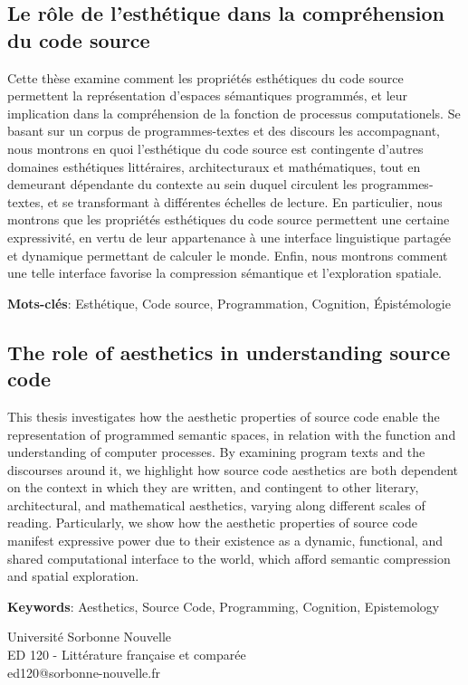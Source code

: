 \small
\subsection*{Le rôle de l'esthétique dans la compréhension du code source}


Cette thèse examine comment les propriétés esthétiques du code source permettent la représentation d'espaces sémantiques programmés, et leur implication dans la compréhension de la fonction de processus computationels. Se basant sur un corpus de programmes-textes et des discours les accompagnant, nous montrons en quoi l'esthétique du code source est contingente d'autres domaines esthétiques littéraires, architecturaux et mathématiques, tout en demeurant dépendante du contexte au sein duquel circulent les programmes-textes, et se transformant à différentes échelles de lecture. En particulier, nous montrons que les propriétés esthétiques du code source permettent une certaine expressivité, en vertu de leur appartenance à une interface linguistique partagée et dynamique permettant de calculer le monde. Enfin, nous montrons comment une telle interface favorise la compression sémantique et l'exploration spatiale.

\textbf{Mots-clés}: Esthétique, Code source, Programmation, Cognition, Épistémologie
\linebreak
\linebreak
\subsection*{The role of aesthetics in understanding source code}

This thesis investigates how the aesthetic properties of source code enable the representation of programmed semantic spaces, in relation with the function and understanding of computer processes. By examining program texts and the discourses around it, we highlight how source code aesthetics are both dependent on the context in which they are written, and contingent to other literary, architectural, and mathematical aesthetics, varying along different scales of reading. Particularly, we show how the aesthetic properties of source code manifest expressive power due to their existence as a dynamic, functional, and shared computational interface to the world, which afford semantic compression and spatial exploration.

\textbf{Keywords}: Aesthetics, Source Code, Programming, Cognition, Epistemology

\normalsize

\clearpage
\null
\vspace{\fill}

Université Sorbonne Nouvelle\\
ED 120 - Littérature française et comparée\\
ed120@sorbonne-nouvelle.fr
